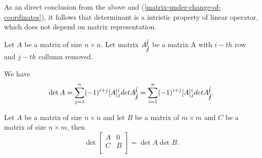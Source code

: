 \documentclass[main.tex]{subfiles}
\begin{document}
As an direct conclusion from the above and (\ref{matrix-under-change-of-coordinates}), it follows that determinant is a intristic property of linear operator, which does not depend on matrix representation.

\begin{definition}
Let $A$ be a matrix of size $n\times n$. Let matrix $A^{\cancel{i}}_{\cancel{j}}$ be a matrix A with $i-th$ row and $j-th$ collumn removed.
\end{definition}

We have
\begin{equation}
\det A = \sum_{j=1}^n (-1)^{i + j} [A]^i_j det A^{\cancel{i}}_{\cancel{j}} = \sum_{i=1}^n (-1)^{i + j} [A]^i_j det A^{\cancel{i}}_{\cancel{j}}.
\end{equation}

\begin{theorem}
\label{det-0}
Let $A$ be a matrix of size $n\times n$ and let $B$ be a matrix of $m\times m$ and $C$ be a matrix of size $n\times m$, then
\begin{equation}
\det \begin{bmatrix}
    A &  0 \\
    C & B \\
\end{bmatrix} = \det A\det B.
\end{equation}
\end{theorem}
\end{document}
